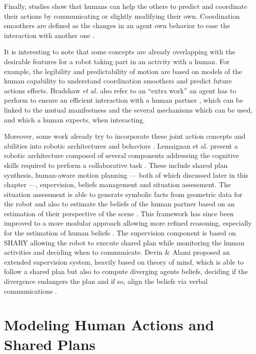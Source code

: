 \documentclass[a4paper,11pt,twoside]{StyleThese}
\begin{document}
Finally, studies show that humans can help the others to predict and coordinate their actions by communicating or slightly modifying their own. Coordination smoothers are defined as the changes in an agent own behavior to ease the interaction with another one \cite{vesper_minimal_2010}.

It is interesting to note that some concepts are already overlapping with the desirable features for a robot taking part in an activity with a human. For example, the legibility and predictability of motion are based on models of the human capability to understand coordination smoothers and predict future actions effects. Bradshaw \textit{et al.} also refer to an ``extra work'' an agent has to perform to ensure an efficient interaction with a human partner \cite{bradshaw2003adjustable}, which can be linked to the mutual manifestness and the several mechanisms which can be used, and which a human expects, when interacting.

Moreover, some work already try to incorporate these joint action concepts and abilities into robotic architectures and behaviors \cite{khamassi2016integration, clodic2017key}. Lemaignan et al. present a robotic architecture composed of several components addressing the cognitive skills required to perform a collaborative task \cite{lemaignan2017artificial}. These include shared plan synthesis, human-aware motion planning --- both of which discussed later in this chapter ---, supervision, beliefs management and situation assessment. The situation assessment is able to generate symbolic facts from geometric data for the robot and also to estimate the beliefs of the human partner based on an estimation of their perspective of the scene \cite{milliez2014framework}. This framework has since been improved to a more modular approach allowing more refined reasoning, especially for the estimation of human beliefs \cite{lemaignan2018underworlds}. The supervision component is based on SHARY \cite{clodic2009shary} allowing the robot to execute shared plan while monitoring the human activities and deciding when to communicate. Devin \& Alami proposed an extended supervision system, heavily based on theory of mind, which is able to follow a shared plan but also to compute diverging agents beliefs, deciding if the divergence endangers the plan and if so, align the beliefs via verbal communications \cite{devin2016implemented}.

\section{Modeling Human Actions and Shared Plans}
\end{document}
